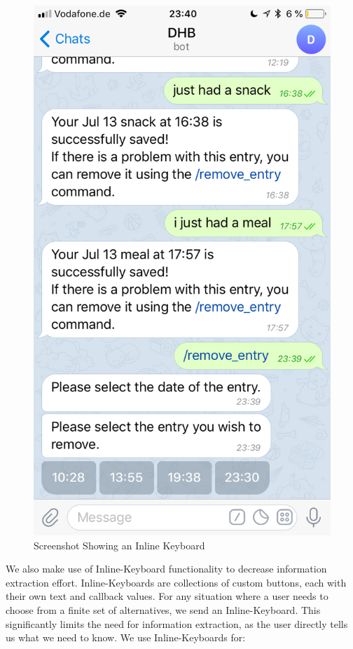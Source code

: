 \begin{figure}[htbp]
\begin{minipage}{.5\textwidth}
	\includegraphics[scale=0.2]{figures/keyboard}
        \caption{Screenshot Showing an Inline Keyboard}
	\label{fig:keyboard}
\end{minipage}
\end{figure}

We also make use of Inline-Keyboard functionality to decrease information extraction effort.
Inline-Keyboards are collections of custom buttons, each with their own text and callback values.
For any situation where a user needs to choose from a finite set of alternatives, we send an Inline-Keyboard.
This significantly limits the need for information extraction, as the user directly tells us what we need to know.
We use Inline-Keyboards for:

